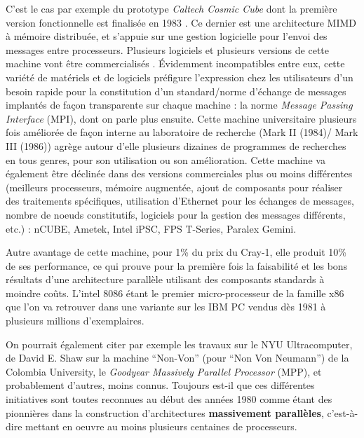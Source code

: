 C'est le cas par exemple du prototype \textit{Caltech Cosmic Cube} dont la première version fonctionnelle est finalisée en 1983 . Ce dernier est une architecture MIMD à mémoire distribuée, et s'appuie sur une gestion logicielle pour l'envoi des messages entre processeurs. Plusieurs logiciels et plusieurs versions de cette machine vont être commercialisés . Évidemment incompatibles entre eux, cette variété de matériels et de logiciels préfigure l'expression chez les utilisateurs d'un besoin rapide pour la constitution d'un standard/norme d'échange de messages implantés de façon transparente sur chaque machine : la norme \textit{Message Passing Interface} (MPI), dont on parle plus ensuite. Cette machine universitaire plusieurs fois améliorée de façon interne au laboratoire de recherche (Mark II (1984)/ Mark III (1986)) agrège autour d'elle plusieurs dizaines de programmes de recherches en tous genres, pour son utilisation ou son amélioration. Cette machine va également être déclinée dans des versions commerciales plus ou moins différentes (meilleurs processeurs, mémoire augmentée, ajout de composants pour réaliser des traitements spécifiques, utilisation d'Ethernet pour les échanges de messages, nombre de noeuds constitutifs, logiciels pour la gestion des messages différents, etc.) : nCUBE, Ametek, Intel iPSC, FPS T-Series, Paralex Gemini.

Autre avantage de cette machine, pour 1\% du prix du Cray-1, elle produit 10\% de ses performance, ce qui prouve pour la première fois la faisabilité et les bons résultats d'une architecture parallèle utilisant des composants standards à moindre coûts. L'intel 8086 étant le premier micro-processeur de la famille x86 que l'on va retrouver dans une variante sur les IBM PC vendus dès 1981 à plusieurs millions d'exemplaires. %

On pourrait également citer par exemple les travaux sur le NYU Ultracomputer, de David E. Shaw sur la machine \enquote{Non-Von} (pour \enquote{Non Von Neumann}) de la Colombia University, le \textit{Goodyear Massively Parallel Processor} (MPP), et probablement d'autres, moins connus. Toujours est-il que ces différentes initiatives sont toutes reconnues au début des années 1980 comme étant des pionnières dans la construction d’architectures \textbf{massivement parallèles}, c'est-à-dire mettant en oeuvre au moins plusieurs centaines de processeurs.

